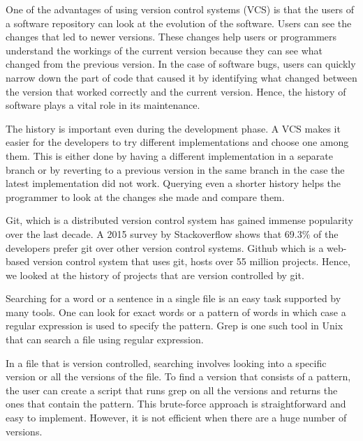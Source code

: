 


One of the advantages of using version control systems (VCS) is that the users of a software repository can look at the evolution of the software. Users can see the changes that led to newer versions. These changes help users or programmers understand the workings of the current version because they can see what changed from the previous version. In the case of software bugs, users can quickly narrow down the part of code that caused it by identifying what changed between the version that worked correctly and the current version. Hence, the history of software plays a vital role in its maintenance. 


The history is important even during the development phase. A VCS makes it easier for the developers to try different implementations and choose one among them. This is either done by having a different implementation in a separate branch or by reverting to a previous version in the same branch in the case the latest implementation did not work. Querying even a shorter history helps the programmer to look at the changes she made and compare them.

Git, which is a distributed version control system has gained immense popularity over the last decade. A 2015 survey by Stackoverflow shows that 69.3$\%$ of the developers prefer git over other version control systems. Github \cite{github} which is a web-based version control system that uses git, hosts over 55 million projects. Hence, we looked at the history of projects that are version controlled by git.


Searching for a word or a sentence in a single file is an easy task supported by many tools.%
One can look for exact words or a pattern of words in which case a regular expression is used to specify the pattern. 
Grep is one such tool in Unix that can search a file using regular expression. 


In a file that is version controlled, searching involves looking into a specific version or all the versions of the file. To find a version that consists of a pattern, the user can create a script that runs grep on all the versions and returns	 the ones that contain the pattern. This brute-force approach is straightforward and easy to implement. However, it is not efficient when there are a huge number of versions.

